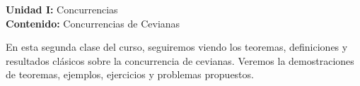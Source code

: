 {\Large
    \textbf{Unidad I:} Concurrencias\vspace{2mm}\\
    \textbf{Contenido:} Concurrencias de Cevianas
}

En esta segunda clase del curso, seguiremos viendo los teoremas, definiciones y resultados clásicos sobre la concurrencia de cevianas.
Veremos la demostraciones de teoremas, ejemplos, ejercicios y problemas propuestos.